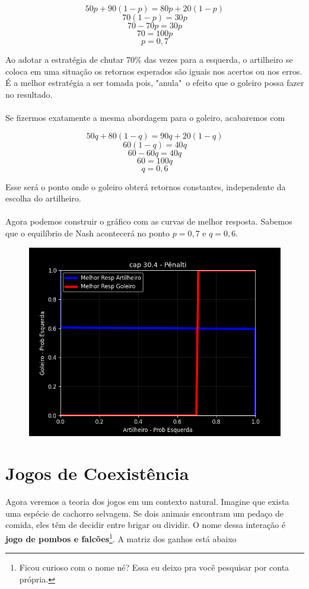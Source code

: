 \documentclass[a4paper,11pt,oneside]{book}
\theoremstyle{definition}
\theoremstyle{break}
\begin{document}
$$50p + 90(1-p) = 80p + 20(1-p)$$
$$70(1-p) = 30p$$
$$70 - 70p = 30p$$
$$70 = 100p$$
$$p = 0,7$$

Ao adotar a estratégia de chutar 70\% das vezes para a esquerda, o artilheiro se coloca em uma situação os retornos esperados são iguais nos acertos ou nos erros. É a melhor estratégia a ser tomada pois, "anula"\ o efeito que o goleiro possa fazer no resultado.
\\~\\
Se fizermos exatamente a mesma abordagem para o goleiro, acabaremos com

$$50q + 80(1-q) = 90q + 20(1-q)$$
$$60(1-q) = 40q$$
$$60 - 60q = 40q$$
$$60 = 100q$$
$$q = 0,6$$

Esse será o ponto onde o goleiro obterá retornos constantes, independente da escolha do artilheiro.
\\~\\
Agora podemos construir o gráfico com as curvas de melhor resposta. Sabemos que o equilíbrio de Nash acontecerá no ponto $p = 0,7$ e $q = 0,6$.

\begin{figure}[H]
\centering
\includegraphics[scale=0.75]{cap30_4-jogos_competitivos.png}
\end{figure}

\section{Jogos de Coexistência}

Agora veremos a teoria dos jogos em um contexto natural. Imagine que exista uma espécie de cachorro selvagem. Se dois animais encontram um pedaço de comida, eles têm de decidir entre brigar ou dividir. O nome dessa interação é \textbf{jogo de pombos e falcões}\footnote{Ficou curioso com o nome né? Essa eu deixo pra você pesquisar por conta própria.}. A matriz dos ganhos está abaixo
\end{document}
